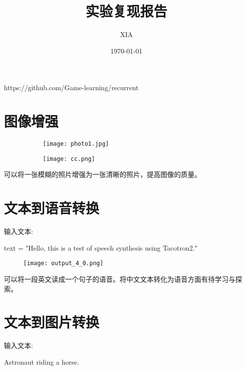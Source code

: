 \documentclass{article}
\title{实验复现报告}
\date{\today}
\author{XIA}
\begin{document}
\maketitle

https://github.com/Game-learning/recurrent

\tableofcontents

\newpage

\section{图像增强}


\begin{figure}[h!]
    \centering
    \begin{subfigure}{0.4\textwidth}
        \centering
        \texttt{[image: photo1.jpg]}
        \caption{}
        \label{fig:subfig1}
    \end{subfigure}
    \hfill
    \begin{subfigure}{0.4\textwidth}
        \centering  
        \texttt{[image: cc.png]}
        \caption{}
        \label{fig:subfig2}
    \end{subfigure}

\end{figure}

可以将一张模糊的照片增强为一张清晰的照片，提高图像的质量。

\section{文本到语音转换}

输入文本:

text = "Hello, this is a test of speech synthesis using Tacotron2."

\begin{figure}[h!]
        \centering
        \texttt{[image: output\_4\_0.png]}

\end{figure}

可以将一段英文读成一个句子的语音。将中文文本转化为语音方面有待学习与探索。

\newpage


\section{文本到图片转换}

输入文本:


Astronaut riding a horse.
\end{document}
